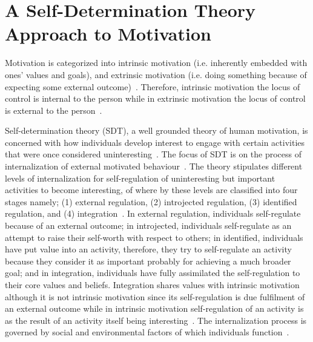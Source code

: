 \section{A Self-Determination Theory Approach to Motivation}
Motivation is categorized into intrinsic motivation (i.e. inherently embedded with ones' values and goals), and extrinsic motivation (i.e. doing something because of expecting some external outcome)~\citep{ryan2000intrinsic}. Therefore, intrinsic motivation the locus of control is internal to the person while in extrinsic motivation the locus of control is external to the person~\citep{lee2015:relating}.

Self-determination theory (SDT)\citep{deci1985:intrinsic}, a well grounded theory of human motivation, is concerned with how individuals develop interest to engage with certain activities that were once considered uninteresting~\citep{ryan2000intrinsic}. The focus of SDT is on the process of internalization of external motivated behaviour~\citep{ryan2000intrinsic}. The theory stipulates different levels of internalization for self-regulation of uninteresting but important activities to become interesting, of where by these levels are classified into four stages namely; (1) external regulation, (2) introjected regulation, (3) identified regulation, and (4) integration~\citep{ryan2000intrinsic}. In external regulation, individuals self-regulate because of an external outcome; in introjected, individuals self-regulate as an attempt to raise their self-worth with respect to others; in identified, individuals have put value into an activity, therefore, they try to self-regulate an activity because they consider it as important probably for achieving a much broader goal; and in integration, individuals have fully assimilated the self-regulation to their core values and beliefs.  Integration shares values with intrinsic motivation although it is not intrinsic motivation since its self-regulation is due fulfilment of an external outcome while in intrinsic motivation self-regulation of an activity is as the result of an activity itself being interesting~\citep{ryan2000intrinsic}. The internalization process is governed by social and environmental factors of which individuals function~\citep{ryan2000:self,lee2015:relating}.


